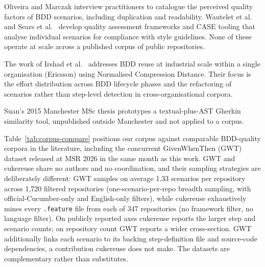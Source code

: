 \documentclass[11pt,a4paper]{article}
\begin{document}
Oliveira and Marczak \citep{oliveira2017quality,oliveira2019quality}
interview practitioners to catalogue the perceived quality factors of
BDD scenarios, including duplication and readability. Wautelet et al.\
\citep{wautelet2023poem} and Sears et al.\ \citep{sears2025profes}
develop quality assessment frameworks and CASE tooling that analyse
individual scenarios for compliance with style guidelines. None of
these operate at scale across a published corpus of public repositories.

The work of Irshad et al.\
\citep{irshad2020ease,irshad2021jss,irshad2022ist} addresses BDD
reuse at industrial scale within a single organisation (Ericsson)
using Normalised Compression Distance. Their focus is the effort
distribution across BDD lifecycle phases and the refactoring of
scenarios rather than step-level detection in cross-organisational
corpora.

Suan's 2015 Manchester MSc thesis \citep{suan2015msc} prototypes a
textual-plus-AST Gherkin similarity tool, unpublished outside
Manchester and not applied to a corpus.

Table~\ref{tab:corpus-compare} positions our corpus against
comparable BDD-quality corpora in the literature, including the
concurrent GivenWhenThen (GWT) dataset
\citep{alcantara2026gwt} released at MSR 2026 in the same month as
this work. GWT and cukereuse share no authors and no coordination,
and their sampling strategies are deliberately different: GWT
samples on average 1.33 scenarios per repository across 1{,}720
filtered repositories (one-scenario-per-repo breadth sampling,
with official-Cucumber-only and English-only filters), while
cukereuse exhaustively mines every \texttt{.feature} file from
each of 347 repositories (no framework filter, no language filter).
On publicly reported axes cukereuse reports the larger step and
scenario counts; on repository count GWT reports a wider
cross-section. GWT additionally links each scenario to its backing
step-definition file and source-code dependencies, a contribution
cukereuse does not make. The datasets are complementary rather
than substitutes.
\end{document}
